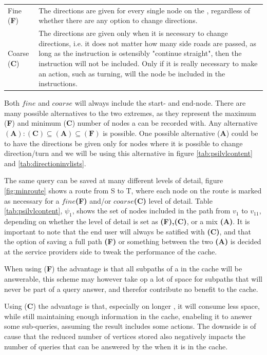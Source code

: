\begin{tabular}{@{}l@{  } p{21em} }
Fine ({\bf F})		& The directions are given for every single node on the \spathns, regardless of whether there are any option to change directions. \\
Coarse ({\bf C})	& The directions are given only when it is necessary to change directions, i.e. it does not matter how many side roads are passed, as long as the instruction is ostensibly "continue straight", then the instruction will not be included. Only if it is really necessary to make an action, such as turning, will the node be included in the instructions.
\end{tabular}

Both $fine$ and $coarse$ will always include the start- and end-node. There are many possible alternatives to the two extremes, as they represent the maximum ({\bf F}) and minimum ({\bf C}) number of nodes a \spath can be recorded with. Any alternative $(\textbf{A}):(\textbf{C}) \subseteq (\textbf{A}) \subseteq (\textbf{F})$ is possible. 
One possible alternative (\textbf{A}) could be to have the directions be given only for nodes where it is possible to change direction/turn and we will be using this alternative in figure \ref{tab:psilvlcontent} and \ref{tab:directioninvlists}. 

The same query can be saved at many different levels of detail, figure \ref{fig:minroute} shows a route from S to T, where each node on the route is marked as necessary for a $fine$\textbf{(F)} and/or $coarse$\textbf{(C)} level of detail. Table \ref{tab:psilvlcontent}, $\psi_1$, shows the set of nodes included in the path from $v_1$ to $v_{11}$, depending on whether the level of detail is set as \textbf{(F),(C)}, or a mix \textbf{(A)}. It is important to note that the end user will always be satified with \textbf{(C)}, and that the option of saving a full path \textbf{(F)} or something between the two \textbf{(A)} is decided at the service providers side to tweak the performance of the \spath cache.


When using (\textbf{F}) the advantage is that all subpaths of a \spath in the cache will be answerable, this scheme may however take op a lot of space for subpaths that will never be part of a query answer, and therefor contribute no benefit to the cache.

Using (\textbf{C}) the advantage is that, especially on longer \spathsns, it will consume less space, while still maintaining enough information in the cache, enabeling it to answer some sub-queries, assuming the result includes some actions. The downside is of cause that the reduced number of vertices stored also negatively impacts the number of queries that can be answered by the \spath when it is in the cache.


